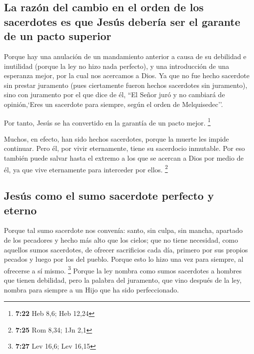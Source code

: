 \begin{paracol}{2}
\hypertarget{la-razuxf3n-del-cambio-en-el-orden-de-los-sacerdotes-es-que-jesuxfas-deberuxeda-ser-el-garante-de-un-pacto-superior}{%
\subsection{La razón del cambio en el orden de los sacerdotes es que
Jesús debería ser el garante de un pacto
superior}\label{la-razuxf3n-del-cambio-en-el-orden-de-los-sacerdotes-es-que-jesuxfas-deberuxeda-ser-el-garante-de-un-pacto-superior}}

 Porque hay una anulación de un mandamiento anterior a
causa de su debilidad e inutilidad  (porque la ley no
hizo nada perfecto), y una introducción de una esperanza mejor, por la
cual nos acercamos a Dios.  Ya que no fue hecho sacerdote
sin prestar juramento  (pues ciertamente fueron hechos
sacerdotes sin juramento), sino con juramento por el que dice de él,
``El Señor juró y no cambiará de opinión,`Eres un sacerdote para
siempre, según el orden de Melquisedec''.

 Por tanto, Jesús se ha convertido en la garantía de un
pacto mejor. \footnote{\textbf{7:22} Heb 8,6; Heb 12,24}

 Muchos, en efecto, han sido hechos sacerdotes, porque la
muerte les impide continuar.  Pero él, por vivir
eternamente, tiene su sacerdocio inmutable.  Por eso
también puede salvar hasta el extremo a los que se acercan a Dios por
medio de él, ya que vive eternamente para interceder por ellos.
\footnote{\textbf{7:25} Rom 8,34; 1Jn 2,1}

\hypertarget{jesuxfas-como-el-sumo-sacerdote-perfecto-y-eterno}{%
\subsection{Jesús como el sumo sacerdote perfecto y
eterno}\label{jesuxfas-como-el-sumo-sacerdote-perfecto-y-eterno}}

 Porque tal sumo sacerdote nos convenía: santo, sin
culpa, sin mancha, apartado de los pecadores y hecho más alto que los
cielos;  que no tiene necesidad, como aquellos sumos
sacerdotes, de ofrecer sacrificios cada día, primero por sus propios
pecados y luego por los del pueblo. Porque esto lo hizo una vez para
siempre, al ofrecerse a sí mismo. \footnote{\textbf{7:27} Lev 16,6; Lev
  16,15}  Porque la ley nombra como sumos sacerdotes a
hombres que tienen debilidad, pero la palabra del juramento, que vino
después de la ley, nombra para siempre a un Hijo que ha sido
perfeccionado.


\end{paracol}
